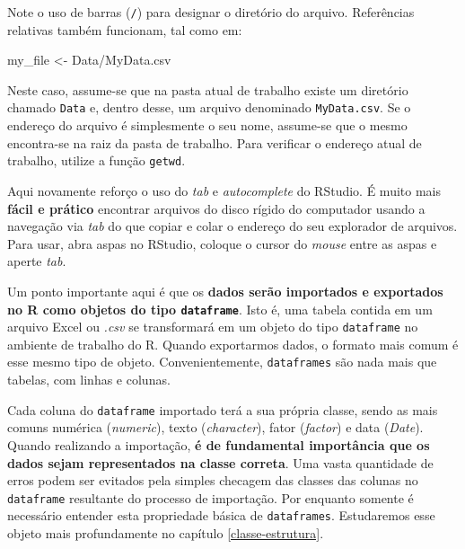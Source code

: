 \documentclass[
  11pt,
]{book}
\newenvironment{Shaded}{\begin{snugshade}}{\end{snugshade}}
\newcommand{\NormalTok}[1]{#1}
\newcommand{\OtherTok}[1]{\textcolor[rgb]{0.37,0.37,0.37}{#1}}
\newcommand{\StringTok}[1]{\textcolor[rgb]{0.5,0.5,0.5}{#1}}
\newenvironment{rmdimportant}
{\begin{importantblock}

	} {\end{importantblock}}
\begin{document}
Note o uso de barras (\texttt{/}) para designar o diretório do arquivo. Referências relativas também funcionam, tal como em:

\begin{Shaded}
\begin{Highlighting}[]
\NormalTok{my\_file }\OtherTok{\textless{}{-}} \StringTok{\textquotesingle{}Data/MyData.csv\textquotesingle{}}
\end{Highlighting}
\end{Shaded}

Neste caso, assume-se que na pasta atual de trabalho existe um diretório chamado \texttt{Data} e, dentro desse, um arquivo denominado \texttt{MyData.csv}. Se o endereço do arquivo é simplesmente o seu nome, assume-se que o mesmo encontra-se na raiz da pasta de trabalho. Para verificar o endereço atual de trabalho, utilize a função \texttt{getwd}. 

\begin{rmdimportant}
Aqui novamente reforço o uso do \emph{tab} e \emph{autocomplete} do
RStudio. É muito mais \textbf{fácil e prático} encontrar arquivos do
disco rígido do computador usando a navegação via \emph{tab} do que
copiar e colar o endereço do seu explorador de arquivos. Para usar, abra
aspas no RStudio, coloque o cursor do \emph{mouse} entre as aspas e
aperte \emph{tab}.
\end{rmdimportant}

Um ponto importante aqui é que os \textbf{dados serão importados e exportados no R como objetos do tipo \texttt{dataframe}}. Isto é, uma tabela contida em um arquivo Excel ou \emph{.csv} se transformará em um objeto do tipo \texttt{dataframe} no ambiente de trabalho do R. Quando exportarmos dados, o formato mais comum é esse mesmo tipo de objeto. Convenientemente, \texttt{dataframes} são nada mais que tabelas, com linhas e colunas.

Cada coluna do \texttt{dataframe} importado terá a sua própria classe, sendo as mais comuns numérica (\emph{numeric}), texto (\emph{character}), fator (\emph{factor}) e data (\emph{Date}). Quando realizando a importação, \textbf{é de fundamental importância que os dados sejam representados na classe correta}. Uma vasta quantidade de erros podem ser evitados pela simples checagem das classes das colunas no \texttt{dataframe} resultante do processo de importação. Por enquanto somente é necessário entender esta propriedade básica de \texttt{dataframes}. Estudaremos esse objeto mais profundamente no capítulo \ref{classe-estrutura}.
\end{document}
